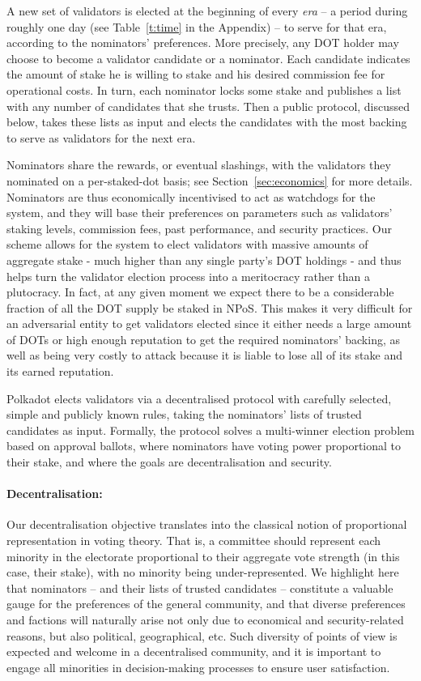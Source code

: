 \documentclass{article}
\begin{document}
A new set of validators is elected at the beginning of every \emph{era} -- a period during roughly one day (see Table~\ref{t:time} in the Appendix) --
to serve for that era, according to the nominators' preferences.
More precisely, any DOT holder may choose to become a validator candidate or a nominator.
Each candidate indicates the amount of stake he is willing to stake and his desired commission fee for operational costs.
In turn, each nominator locks some stake and publishes a list with any number of candidates that she trusts.
Then a public protocol, discussed below, takes these lists as input and elects the candidates
with the most backing to serve as validators for the next era.

Nominators share the rewards, or eventual slashings, with the validators they nominated on a per-staked-dot basis; 
see Section~\ref{sec:economics} for more details. 
Nominators are thus economically incentivised to act as watchdogs for the system, and they will base their preferences 
on parameters such as validators' staking levels, commission fees, past performance, and security practices.
Our scheme allows for the system to elect validators with massive amounts of aggregate stake
- much higher than any single party's DOT holdings -
and thus helps turn the validator election process into a meritocracy rather than a plutocracy.
In fact, at any given moment we expect there to be a considerable fraction of all the DOT supply be staked in NPoS.
This makes it very difficult for an adversarial entity to get validators elected since it either needs a large amount of DOTs or high enough reputation to get the required nominators' backing,
as well as being very costly to attack because it is liable to lose all of its stake and its earned reputation.

Polkadot elects validators via a decentralised protocol with carefully selected, simple and publicly known rules,
taking the nominators' lists of trusted candidates as input. Formally, the protocol solves a multi-winner election
problem based on approval ballots, where nominators have voting power proportional to their stake,
and where the goals are decentralisation and security.

\paragraph{Decentralisation:}  
Our decentralisation objective translates into the classical notion of proportional representation in voting theory.
That is, a committee should represent each minority in the electorate proportional to their aggregate vote strength (in this case, their stake), with no minority being under-represented. 
We highlight here that nominators -- and their lists of trusted candidates -- constitute a valuable gauge for the preferences of the general community, and that diverse preferences and factions will naturally arise not only due to economical and security-related reasons, but also political, geographical, etc. Such diversity of points of view is expected and welcome in a decentralised community, and it is important to engage all minorities in decision-making processes to ensure user satisfaction. 
\end{document}
